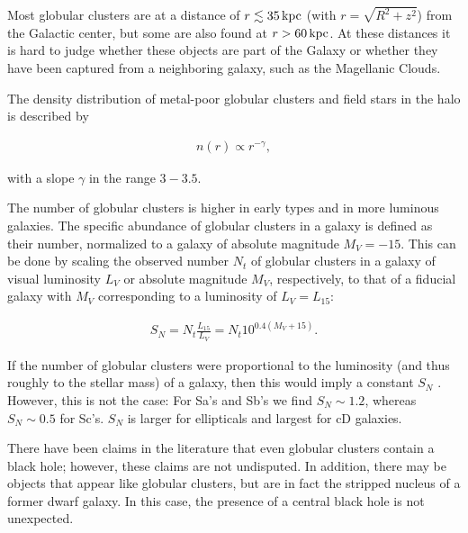 \documentclass[a4paper,11pt]{article}
\begin{document}
{\noindent}Most globular clusters are at a distance of $r\lesssim35\,{\rm kpc}$ (with $r=\sqrt{R^2+z^2}$) from the Galactic center, but some are also found at $r>60\,{\rm kpc}$. At these distances it is hard to judge whether these objects are part of the Galaxy or whether they have been captured from a neighboring galaxy, such as the Magellanic Clouds.

{\noindent}The density distribution of metal-poor globular clusters and field stars in the halo is described by

\begin{align*}
    n(r)\propto r^{-\gamma},
\end{align*}

{\noindent}with a slope $\gamma$ in the range $3-3.5$.

{\noindent}The number of globular clusters is higher in early types and in more luminous galaxies. The specific abundance of globular clusters in a galaxy is defined as their number, normalized to a galaxy of absolute magnitude $M_V=-15$. This can be done by scaling the observed number $N_t$ of globular clusters in a galaxy of visual luminosity $L_V$ or absolute magnitude $M_V$, respectively, to that of a fiducial galaxy with $M_V$ corresponding to a luminosity of $L_V=L_{15}$:

\begin{align*}
    S_N = N_t\frac{L_{15}}{L_V} = N_t10^{0.4(M_V+15)}.
\end{align*}

{\noindent}If the number of globular clusters were proportional to the luminosity (and thus roughly to the stellar mass) of a galaxy, then this would imply a constant $S_N$ . However, this is not the case: For Sa's and Sb's we find $S_N\sim1.2$, whereas $S_N\sim0.5$ for Sc's. $S_N$ is larger for ellipticals and largest for cD galaxies.

{\noindent}There have been claims in the literature that even globular clusters contain a black hole; however, these claims are not undisputed. In addition, there may be objects that appear like globular clusters, but are in fact the stripped nucleus of a former dwarf galaxy. In this case, the presence of a central black hole is not unexpected.
\end{document}

